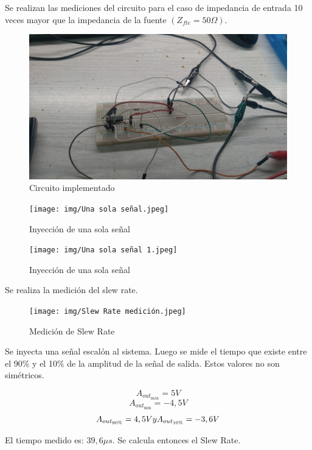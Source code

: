 \hspace{1mm} Se realizan las mediciones del circuito para el caso de impedancia de entrada 10 veces mayor que la impedancia de la fuente \((Z_{fte}= 50\Omega)\).

\begin{figure}[h!]
    \centering
    \includegraphics[width=0.80\linewidth]{img/Circuito implementado.jpeg}
    \caption{Circuito implementado}
    
\end{figure}
\begin{figure}[h!]
    \centering
    \texttt{[image: img/Una sola señal.jpeg]}
    \caption{Inyección de una sola señal}
    
\end{figure}

\begin{figure}[H]
    \centering
    \texttt{[image: img/Una sola señal 1.jpeg]}
    \caption{Inyección de una sola señal}
    
\end{figure}

\newpage
\hspace{1mm} Se realiza la medición del slew rate.
\begin{figure}[H]
    \centering
    \texttt{[image: img/Slew Rate medición.jpeg]}
    \caption{Medición de Slew Rate}
    
\end{figure}

Se inyecta una señal escalón al sistema. Luego se mide el tiempo que existe entre el 90\% y el 10\% de la amplitud de la señal de salida. Estos valores no son simétricos.

\[A_{out_{\text{máx}}}= 5V\]
\[A_{out_{\text{mín}}} = -4,5V\] 
\[A_{out_{90\%}}= 4,5V \space y \space A_{out_{10\%}}= -3,6V\]

El tiempo medido es: \(39,6\mu s\). Se calcula entonces el Slew Rate.

